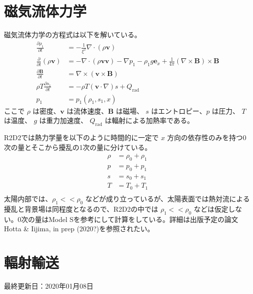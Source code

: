 \documentclass[letterpaper,10pt,dvipdfmx,report]{sphinxmanual}
\begin{document}
\section{磁気流体力学}
\label{\detokenize{equation:id2}}
磁気流体力学の方程式は以下を解いている。
\begin{equation*}
\begin{split}\frac{\partial \rho_1}{\partial t} &= - \frac{1}{\xi^2}\nabla\cdot
\left(\rho \boldsymbol{v}\right) \\
\frac{\partial}{\partial t}\left(\rho \boldsymbol{v}\right) &=
-\nabla\cdot\left(\rho\boldsymbol{vv}\right)
- \nabla p_1 - \rho_1 g\boldsymbol{e}_x
+\frac{1}{4\pi}\left(\nabla\times\boldsymbol{B}\right)
\times\boldsymbol{B} \\
\frac{\partial \boldsymbol{B}}{\partial t} &=
\nabla\times\left(\boldsymbol{v\times B}\right)
\\
\rho T \frac{\partial s_1}{\partial t} &= -\rho T
\left(\boldsymbol{v}\cdot\nabla\right) s + Q_\mathrm{rad} \\
p_1 &= p_1(\rho_1,s_1,x)\end{split}
\end{equation*}
ここで \(\rho\) は密度、\(\boldsymbol{v}\) は流体速度、\(\boldsymbol{B}\) は磁場、 \(s\) はエントロピー、\(p\) は圧力、 \(T\) は温度、 \(g\) は重力加速度、 \(Q_\mathrm{rad}\) は輻射による加熱率である。

R2D2では熱力学量を以下のように時間的に一定で \(x\) 方向の依存性のみを持つ0次の量とそこから擾乱の1次の量に分けている。
\begin{equation*}
\begin{split}\rho &= \rho_0 + \rho_1 \\
p &= p_0 + p_1 \\
s &= s_0 + s_1 \\
T &= T_0 + T_1 \\\end{split}
\end{equation*}
太陽内部では、\(\rho_1 << \rho_0\) などが成り立っているが、太陽表面では熱対流による擾乱と背景場は同程度となるので、R2D2の中では \(\rho_1 << \rho_0\) などは仮定しない。0次の量はModel Sを参考にして計算をしている。詳細は出版予定の論文Hotta \& Iijima, in prep (2020?)を参照されたい。


\section{輻射輸送}
\label{\detokenize{equation:id3}}
最終更新日：2020年01月08日
\end{document}
